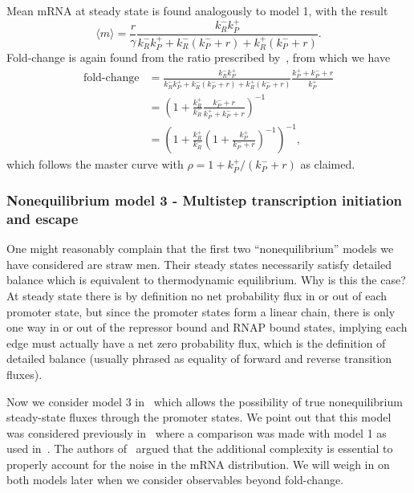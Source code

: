 Mean mRNA at steady state is found analogously to model 1, with the result
\begin{equation}
\langle m\rangle = \frac{r}{\gamma}
        \frac{k_R^- k_P^+}
        {k_R^- k_P^+ + k_R^- (k_P^- + r) + k_R^+ (k_P^- + r)}.
\end{equation}
Fold-change is again found from the ratio prescribed by~, from
which we have
\begin{align}
\text{fold-change}
&=      \frac{k_R^- k_P^+}
        {k_R^- k_P^+ + k_R^- (k_P^- + r) + k_R^+ (k_P^- + r)}
        \frac{k_P^+ + k_P^- + r}{k_P^+}
\\
&=      \left(1 + \frac{k_R^+}{k_R^-}
                \frac{k_P^- + r}{k_P^+ + k_P^- + r}
        \right)^{-1}
\\
&=      \left(1 + \frac{k_R^+}{k_R^-}
        \left(1 + \frac{k_P^+}{k_P^- + r}\right)^{-1}
        \right)^{-1},
\end{align}
which follows the master curve with $\rho = 1 + k_P^+/(k_P^- + r)$ as claimed.

\subsubsection{Nonequilibrium model 3 - Multistep transcription initiation and
escape} One might reasonably complain that the first two ``nonequilibrium''
models we have considered are straw men. Their steady states necessarily satisfy
detailed balance which is equivalent to thermodynamic equilibrium. Why is this
the case? At steady state there is by definition no net probability flux in or
out of each promoter state, but since the promoter states form a linear chain,
there is only one way in or out of the repressor bound and RNAP bound states,
implying each edge must actually have a net zero probability flux, which is the
definition of detailed balance (usually phrased as equality of forward and
reverse transition fluxes).

Now we consider model 3 in~ which allows the possibility
of true nonequilibrium steady-state fluxes through the promoter states. We point
out that this model was considered previously in~\cite{Mitarai2015} where a
comparison was made with model 1 as used in~\cite{Jones2014}. The authors
of~\cite{Mitarai2015} argued that the additional complexity is essential to
properly account for the noise in the mRNA distribution. We will weigh in on
both models later when we consider observables beyond fold-change.

